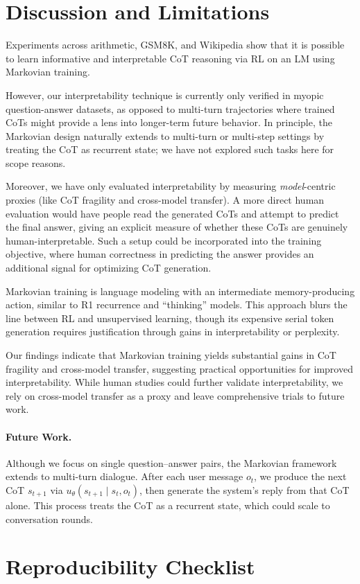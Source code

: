 \documentclass[letterpaper]{article} %
\begin{document}
\section{Discussion and Limitations}
\label{sec:disc}

Experiments across arithmetic, GSM8K, and Wikipedia show that it is possible to learn informative and interpretable CoT reasoning via RL on an LM using Markovian training.

However, our interpretability technique is currently only verified in myopic question-answer datasets, as opposed to multi-turn trajectories where trained CoTs might provide a lens into longer-term future behavior. In principle, the Markovian design naturally extends to multi-turn or multi-step settings by treating the CoT as recurrent state; we have not explored such tasks here for scope reasons.

Moreover, we have only evaluated interpretability by measuring \emph{model}-centric proxies (like CoT fragility and cross-model transfer). A more direct human evaluation would have people read the generated CoTs and attempt to predict the final answer, giving an explicit measure of whether these CoTs are genuinely human-interpretable. Such a setup could be incorporated into the training objective, where human correctness in predicting the answer provides an additional signal for optimizing CoT generation.

Markovian training is language modeling with an intermediate memory-producing action, similar to R1 recurrence and ``thinking'' models. This approach blurs the line between RL and unsupervised learning, though its expensive serial token generation requires justification through gains in interpretability or perplexity.

Our findings indicate that Markovian training yields substantial gains in CoT fragility and cross-model transfer, suggesting practical opportunities for improved interpretability. While human studies could further validate interpretability, we rely on cross-model transfer as a proxy and leave comprehensive trials to future work.

\paragraph{Future Work.}
Although we focus on single question–answer pairs, the Markovian framework extends to multi-turn dialogue. After each user message $o_t$, we produce the next CoT $s_{t+1}$ via $u_\theta(s_{t+1}\mid s_t,o_t)$, then generate the system's reply from that CoT alone. This process treats the CoT as a recurrent state, which could scale to conversation rounds.




\section*{Reproducibility Checklist}

\def\isChecklistMainFile{}

\end{document}
